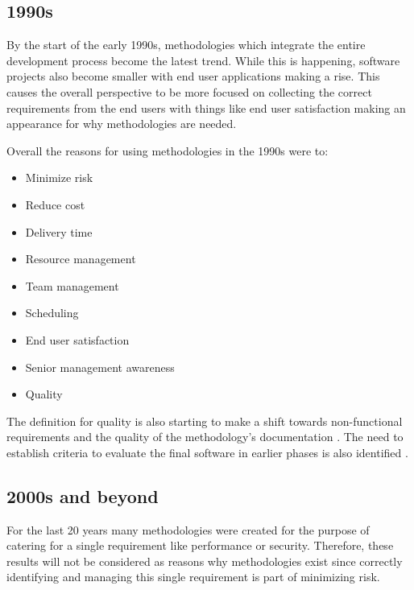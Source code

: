 \subsection{1990s}
By the start of the early 1990s, methodologies which integrate the entire development process become the latest trend.
While this is happening, software projects also become smaller with end user applications making a rise.
This causes the overall perspective to be more focused on collecting the correct requirements \cite{paul_1993} from the end users with things like end user satisfaction making an appearance for why methodologies are needed.
\cite{drake_1991}

Overall the reasons for using methodologies in the 1990s were to:
\begin{itemize}
    \item Minimize risk \cite{drake_1991, trussel_1999}
    \item Reduce cost \cite{drake_1991, scarre_1992, paul_1993}
    \item Delivery time \cite{drake_1991, scarre_1992, herald_1993, trussel_1999}
    \item Resource management \cite{drake_1991}
    \item Team management \cite{drake_1991}
    \item Scheduling \cite{drake_1991, paul_1993}
    \item End user satisfaction \cite{drake_1991}
    \item Senior management awareness \cite{drake_1991}
    \item Quality \cite{drake_1991, scarre_1992, herald_1993, trussel_1999}
\end{itemize}

The definition for quality is also starting to make a shift towards non-functional requirements and the quality of the methodology's documentation \cite{scarre_1992}.
The need to establish criteria to evaluate the final software in earlier phases is also identified \cite{paul_1993, herald_1993, grossman_1997}.

\subsection{2000s and beyond}
For the last 20 years many methodologies were created for the purpose of catering for a single requirement like performance or security.
Therefore, these results will not be considered as reasons why methodologies exist since correctly identifying and managing this single requirement is part of minimizing risk.

